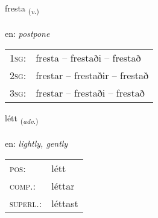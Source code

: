\documentclass[frontgrid, backgrid]{flacards}\usepackage[]{graphicx}\usepackage[]{color}
\begin{document}
\renewcommand{\flhead}{\vskip5pt \fboxsep=0pt {\small\bfseries\footnotesize Sagnorð | Verb}}
\renewcommand{\fcfoot}{\vskip5pt \fboxsep=0pt \hspace{2pt}{\small\bfseries\footnotesize 2K}}

\renewcommand{\blhead}{\vskip5pt {\small\bfseries\footnotesize Sagnorð | Verb }}
\renewcommand{\bcfoot}{\vskip5pt \hspace{2pt}{\small\bfseries\footnotesize 2K}}


{fresta \small{\textsubscript{(\textit{v.})}} \\[1ex] %
\textphonetic{[frɛsta]} \\
en: \emph{postpone} \\  [2ex]
\renewcommand*{\arraystretch}{0.8}
\begin{tabular}{p{1cm}l}
\textsc{1sg}: & fresta -- frestaði -- frestað \\ 
\textsc{2sg}: & frestar -- frestaðir -- frestað \\ 
\textsc{3sg}: & frestar -- frestaði -- frestað \\ 
\end{tabular}
}

\renewcommand{\flhead}{\vskip5pt \fboxsep=0pt {\small\bfseries\footnotesize Atviksorð | Adverb}}
\renewcommand{\fcfoot}{\vskip5pt \fboxsep=0pt \hspace{2pt}{\small\bfseries\footnotesize 2K}}

\renewcommand{\blhead}{\vskip5pt {\small\bfseries\footnotesize Atviksorð | Adverb }}
\renewcommand{\bcfoot}{\vskip5pt \hspace{2pt}{\small\bfseries\footnotesize 2K}}


{létt \small{\textsubscript{(\textit{adv.})}} \\[1ex] %
\textphonetic{[ljɛht]} \\
en: \emph{lightly, gently} \\  [2ex]
\renewcommand*{\arraystretch}{0.8}
\begin{tabular}{ll}
\textsc{pos}: & létt \\ 
\textsc{comp.}: & léttar \\ 
\textsc{superl.}: & léttast \\
\end{tabular}
}
\end{document}
